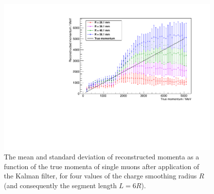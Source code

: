 \begin{figure}
\centering
\includegraphics[angle=-90,width=\textwidth]{chapters/trackfitting_images/kalman-mu-momentum-reconstruction}
\caption[Reconstructed momenta for various Kalman filter parameters]{\label{fig:kalman-mu-momentum-charge-radius-variations}The mean and standard deviation of reconstructed momenta as a function of the true momenta of single muons after application of the Kalman filter, for four values of the charge smoothing radius $R$ (and consequently the segment length $L=6R$).}
\end{figure}

